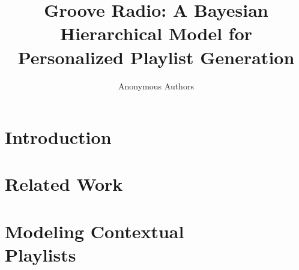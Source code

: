 \documentclass{sig-alternate}
\title{Groove Radio: A Bayesian Hierarchical Model for Personalized Playlist Generation}
\begin{document}


\author{
	\alignauthor
	Anonymous Authors\\
	\alignauthor
}



\maketitle

\begin{abstract}
	
\end{abstract}
\section{Introduction}
\label{sec:Introduction}
   
\section{Related Work}
\label{sec:Related}
    
\section{Modeling Contextual\\ Playlists}
\label{sec:ourapproach}
    
\end{document}
